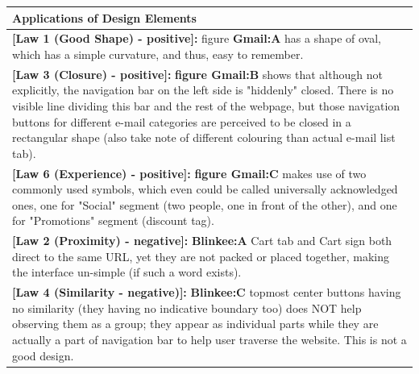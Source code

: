 \documentclass[a4paper,11pt,oneside]{scrreprt}
\begin{document}
\clearpage
\begin{tabularx}{\textwidth}{|X|}
	\hline
	\textbf{Applications of Design Elements}\\
	\hline
	\textbf{{[Law 1 (Good Shape) - positive]:}} figure \textbf{Gmail:A} has a shape of oval, which has a simple curvature, and thus, easy to remember.\\
	\hline
	\textbf{{[Law 3 (Closure) - positive]:}} \textbf{figure Gmail:B} shows that although not explicitly, the navigation bar on the left side is "hiddenly" closed. There is no visible line dividing this bar and the rest of the webpage, but those navigation buttons for different e-mail categories are perceived to be closed in a rectangular shape (also take note of different colouring than actual e-mail list tab).\\
	\hline
	\textbf{{[Law 6 (Experience) - positive]:}} \textbf{figure Gmail:C} makes use of two commonly used symbols, which even could be called universally acknowledged ones, one for "Social" segment (two people, one in front of the other), and one for "Promotions" segment (discount tag).\\
	\hline
	\textbf{{[Law 2 (Proximity) - negative]:}} \textbf{Blinkee:A} Cart tab and Cart sign both direct to the same URL, yet they are not packed or placed together, making the interface un-simple (if such a word exists). \\
	\hline
	\textbf{{[Law 4 (Similarity - negative)]:}} \textbf{Blinkee:C} topmost center buttons having no similarity (they having no indicative boundary too) does NOT help observing them as a group; they appear as individual parts while they are actually a part of navigation bar to help user traverse the website. This is not a good design.\\
	\hline
\end{tabularx}

\bigskip

\bigskip
\end{document}
